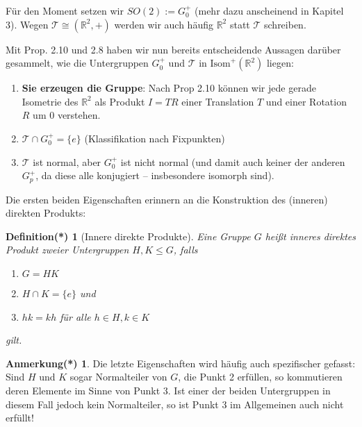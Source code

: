 \documentclass[a4paper, ngerman]{article}
\newcounter{chapter}
\numberwithin{equation}{chapter}
\theoremstyle{plain}
\newtheorem{definitionstrd}{Definition(*)}[chapter]
\theoremstyle{definition}
\newtheorem{annotationstrd}{Anmerkung(*)}[chapter]
\newcommand{\geradisometr}{\ensuremath{\mathrm{Isom}^+(\mathbb R^2)}}
\newcommand{\anm}[1]{{\color{red} #1}}
\begin{document}
Für den Moment setzen wir \(SO(2):= G_0^+\) (mehr dazu anscheinend in Kapitel 3). Wegen \(\mathcal T \cong (\mathbb R^2, +)\) werden wir auch häufig \(\mathbb R^2\) statt \(\mathcal T\) schreiben. 

Mit Prop. 2.10 und 2.8 haben wir nun bereits entscheidende Aussagen darüber gesammelt, wie die Untergruppen \(G_0^+\) und \(\mathcal T\) in \(\geradisometr\) liegen: 
\begin{enumerate}
    \item \textbf{Sie erzeugen die Gruppe}: Nach Prop 2.10 können wir jede gerade Isometrie des \(\mathbb R^2\) als Produkt \(I=TR\) einer Translation \(T\) und einer Rotation \(R\) um \(0\) verstehen. 
    \item \(\mathcal T \cap G_0^+ = \{e\}\) (Klassifikation nach Fixpunkten) %
    \item \(\mathcal T\) ist normal, aber \(G_0^+\) ist nicht normal (und damit auch keiner der anderen \(G_p^+\), da diese alle konjugiert -- insbesondere isomorph sind). %
\end{enumerate}
Die ersten beiden Eigenschaften erinnern an die Konstruktion des (inneren) direkten Produkts: 
\begin{definitionstrd}[Innere direkte Produkte]\label{def*:innere-direkte-produkte}
    Eine Gruppe \(G\) heißt \emph{inneres direktes Produkt} zweier Untergruppen \(H,K \leq G\), falls 
    \begin{enumerate}
        \item \(G = HK\)
        \item \(H \cap K = \{e\}\) und 
        \item \(hk = kh\) für alle \(h\in H, k \in K\)
    \end{enumerate}
    gilt. 
\end{definitionstrd}
\begin{annotationstrd}\label{ann*:innere-direkte-produkte-über-normalteiler}
    Die letzte Eigenschaften wird häufig auch spezifischer gefasst: Sind \(H\) und \(K\) sogar Normalteiler von \(G\), die Punkt 2 erfüllen, so kommutieren deren Elemente im Sinne von Punkt 3. Ist einer der beiden Untergruppen in diesem Fall jedoch kein Normalteiler, so ist Punkt 3 im Allgemeinen auch nicht erfüllt!
\end{annotationstrd}
\end{document}
